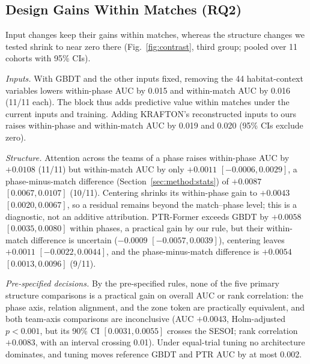 \documentclass[sigconf,anonymous]{acmart}
\begin{document}
\subsection{Design Gains Within Matches (RQ2)}
\label{sec:results:inputs}
Input changes keep their gains within matches, whereas the structure changes we tested shrink to near zero there (Fig.~\ref{fig:contrast}, third group; pooled over 11 cohorts with 95\% CIs).

\emph{Inputs.} With GBDT and the other inputs fixed, removing the 44 habitat-context variables lowers within-phase AUC by 0.015 and within-match AUC by 0.016 (11/11 each). The block thus adds predictive value within matches under the current inputs and training. Adding KRAFTON's reconstructed inputs to ours raises within-phase and within-match AUC by 0.019 and 0.020 (95\% CIs exclude zero).

\emph{Structure.} Attention across the teams of a phase raises within-phase AUC by $+0.0108$ (11/11) but within-match AUC by only $+0.0011$ $[-0.0006,\allowbreak 0.0029]$, a phase-minus-match difference (Section~\ref{sec:method:stats}) of $+0.0087$ $[0.0067,\allowbreak 0.0107]$ (10/11). Centering shrinks its within-phase gain to $+0.0043$ $[0.0020,\allowbreak 0.0067]$, so a residual remains beyond the match--phase level; this is a diagnostic, not an additive attribution. PTR-Former exceeds GBDT by $+0.0058$ $[0.0035,\allowbreak 0.0080]$ within phases, a practical gain by our rule, but their within-match difference is uncertain ($-0.0009$ $[-0.0057,\allowbreak 0.0039]$), centering leaves $+0.0011$ $[-0.0022,\allowbreak 0.0044]$, and the phase-minus-match difference is $+0.0054$ $[0.0013,\allowbreak 0.0096]$ (9/11).

\emph{Pre-specified decisions.} By the pre-specified rules, none of the five primary structure comparisons is a practical gain on overall AUC or rank correlation: the phase axis, relation alignment, and the zone token are practically equivalent, and both team-axis comparisons are inconclusive (AUC $+0.0043$, Holm-adjusted $p<0.001$, but its 90\% CI $[0.0031,\allowbreak 0.0055]$ crosses the SESOI; rank correlation $+0.0083$, with an interval crossing 0.01). Under equal-trial tuning no architecture dominates, and tuning moves reference GBDT and PTR AUC by at most 0.002.
\end{document}
